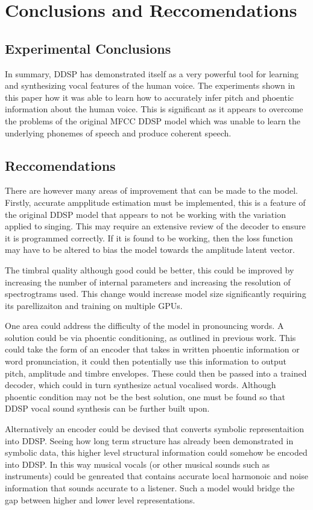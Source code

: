 \chapter{Conclusions and Reccomendations}

\section{Experimental Conclusions}

In summary, DDSP has demonstrated itself as a very powerful tool for learning and synthesizing vocal features of the human voice. The experiments shown in this paper how it was able to learn how to accurately infer pitch and phoentic information about the human voice. This is significant as it appears to overcome the problems of the original MFCC DDSP model\cite{SingingDDSP} which was unable to learn the underlying phonemes of speech and produce coherent speech.

\section{Reccomendations}

There are however many areas of improvement that can be made to the model. Firstly, accurate ampplitude estimation must be implemented, this is a feature of the original DDSP model\cite{OriginalDDSP} that appears to not be working with the variation applied to singing. This may require an extensive review of the decoder to ensure it is programmed correctly. If it is found to be working, then the loss function may have to be altered to bias the model towards the amplitude latent vector.

The timbral quality although good could be better, this could be improved by increasing the number of internal parameters and increasing the resolution of spectrogtrams used. This change would increase model size significantly requiring its parellizaiton and training on multiple GPUs.

One area could address the difficulty of the model in pronouncing words. A solution could be via phoentic conditioning, as outlined in previous work\cite{SingingDDSP}. This could take the form of an encoder that takes in written phoentic information or word pronunciation, it could then potentially use this information to output pitch, amplitude and timbre envelopes. These could then be passed into a trained decoder, which could in turn synthesize actual vocalised words. Although phoentic condition may not be the best solution, one must be found so that DDSP vocal sound synthesis can be further built upon.

Alternatively an encoder could be devised that converts symbolic representaition into DDSP. Seeing how long term structure has already been demonstrated in symbolic data\cite{Attention}, this higher level structural information could somehow be encoded into DDSP. In this way musical vocals (or other musical sounds such as instruments) could be genreated that contains accurate local harmonoic and noise information that sounds accurate to a listener. Such a model would bridge the gap between higher and lower level representations.